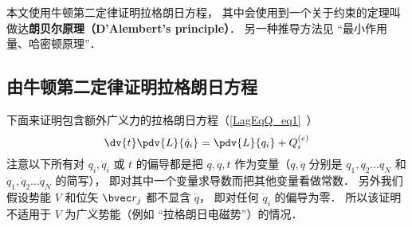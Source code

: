 

本文使用牛顿第二定律证明拉格朗日方程， 其中会使用到一个关于约束的定理叫做达\textbf{朗贝尔原理（D'Alembert's principle）}． 另一种推导方法见 “最小作用量、哈密顿原理”．

\subsection{由牛顿第二定律证明拉格朗日方程}
下面来证明包含额外广义力的拉格朗日方程（\autoref{LagEqQ_eq1}~）
\begin{equation}
\dv{t} \pdv{L}{\dot q_i} = \pdv{L}{q_i} + Q_i^{(e)}
\end{equation}
注意以下所有对 $q_i, \dot q_i$ 或 $t$ 的偏导都是把 $q, \dot q, t$ 作为变量（$q, \dot q$ 分别是 $q_1, q_2\dots q_N$ 和 $\dot q_1, \dot q_2\dots \dot q_N$ 的简写）， 即对其中一个变量求导数而把其他变量看做常数． 另外我们假设势能 $V$ 和位矢 $\bvec r_j$ 都不显含 $\dot q$， 即对任何 $\dot q_i$ 的偏导为零． 所以该证明不适用于 $V$ 为广义势能（例如 “拉格朗日电磁势”）的情况．

